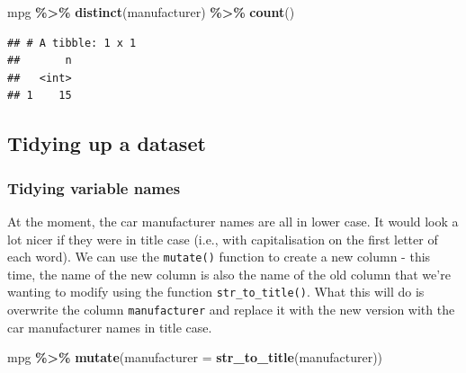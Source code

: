 \documentclass[
]{book}
\newenvironment{Shaded}{\begin{snugshade}}{\end{snugshade}}
\newcommand{\AttributeTok}[1]{\textcolor[rgb]{0.13,0.29,0.53}{#1}}
\newcommand{\FunctionTok}[1]{\textcolor[rgb]{0.13,0.29,0.53}{\textbf{#1}}}
\newcommand{\NormalTok}[1]{#1}
\newcommand{\SpecialCharTok}[1]{\textcolor[rgb]{0.81,0.36,0.00}{\textbf{#1}}}
\begin{document}
\begin{Shaded}
\begin{Highlighting}[]
\NormalTok{mpg }\SpecialCharTok{\%\textgreater{}\%} 
  \FunctionTok{distinct}\NormalTok{(manufacturer) }\SpecialCharTok{\%\textgreater{}\%}
  \FunctionTok{count}\NormalTok{()}
\end{Highlighting}
\end{Shaded}

\begin{verbatim}
## # A tibble: 1 x 1
##       n
##   <int>
## 1    15
\end{verbatim}

\hypertarget{tidying-up-a-dataset}{%
\subsection{Tidying up a dataset}\label{tidying-up-a-dataset}}

\hypertarget{tidying-variable-names}{%
\subsubsection*{Tidying variable names}\label{tidying-variable-names}}

At the moment, the car manufacturer names are all in lower case. It would look a lot nicer if they were in title case (i.e., with capitalisation on the first letter of each word). We can use the \texttt{mutate()} function to create a new column - this time, the name of the new column is also the name of the old column that we're wanting to modify using the function \texttt{str\_to\_title()}. What this will do is overwrite the column \texttt{manufacturer} and replace it with the new version with the car manufacturer names in title case.

\begin{Shaded}
\begin{Highlighting}[]
\NormalTok{mpg }\SpecialCharTok{\%\textgreater{}\%}
  \FunctionTok{mutate}\NormalTok{(}\AttributeTok{manufacturer =} \FunctionTok{str\_to\_title}\NormalTok{(manufacturer)) }
\end{Highlighting}
\end{Shaded}
\end{document}
